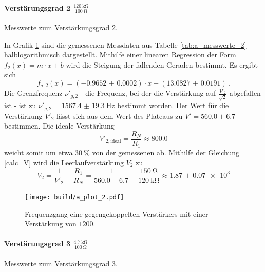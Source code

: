 \paragraph{Verstärungsgrad 2 $\frac{\SI{120}{\kilo\ohm}}{\SI{100}{\ohm}}$}

\begin{table}
\centering
\caption{Messwerte zum Verstärkungsgrad 2.}
    \label{tab:a_messwerte_2}
    
\end{table}

In Grafik \ref{fig:a_plot_2} sind die gemessenen Messdaten aus Tabelle \ref{tab:a_messwerte_2} halblogarithmisch dargestellt.
Mithilfe einer linearen Regression der Form $f_2(x)= m \cdot x + b$ wird die Steigung der fallenden Geraden bestimmt.
Es ergibt sich
\begin{equation*}
	f_{a,2}(x) = (\num{-0.9652(2)}) \cdot x + (\num{13.0827(191)})\,.
\end{equation*}
Die Grenzfrequenz $\nu'_{g,2}$ - die Frequenz, bei der die Verstärkung auf $\frac{V'_2}{\sqrt{2}}$ abgefallen ist - ist zu $\nu'_{g,2} = \SI{1567.4(193)}{\hertz}$ bestimmt worden.
Der Wert für die Verstärkung $V'_2$ lässt sich aus dem Wert des Plateaus zu $V'=560.0\pm6.7$ bestimmen.
Die ideale Verstärkung 
\begin{equation*}
    V'_{2,\text{ideal}} = \frac{R_N}{R_1} \approx 800.0
\end{equation*}
weicht somit um etwa $\SI{30}{\percent}$ von der gemessenen ab.
Mithilfe der Gleichung \eqref{calc_V} wird die Leerlaufverstärkung $V_2$ zu
\begin{equation*}
	V_2 = \frac{1}{V'_2} - \frac{R_1}{R_N} = \frac{1}{560.0\pm6.7} - \frac{\SI{150}{\ohm}}{\SI{120}{\kilo\ohm}} \approx 
    \num{1.87(7)e3}
\end{equation*}

\begin{figure}[h!]
    \centering
    \texttt{[image: build/a\_plot\_2.pdf]}
    \caption{Frequenzgang eine gegengekoppelten Verstärkers mit einer Verstärkung von $1200$.}
    \label{fig:a_plot_2}
\end{figure}

\paragraph{Verstärungsgrad 3 $\frac{\SI{4.7}{\kilo\ohm}}{\SI{100}{\ohm}}$}

\begin{table}
\centering
\caption{Messwerte zum Verstärkungsgrad 3.}
    \label{tab:a_messwerte_3}
    
\end{table}

